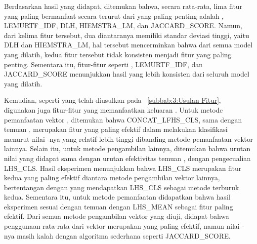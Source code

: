 Berdasarkan hasil yang didapat, ditemukan bahwa, secara rata-rata, lima fitur yang paling bermanfaat secara terurut dari yang paling penting adalah \obm{}, LEMURTF\_IDF, DLH, HIEMSTRA\_LM, dan JACCARD\_SCORE. Namun, dari kelima fitur tersebut, dua diantaranya memiliki standar deviasi tinggi, yaitu DLH dan HIEMSTRA\_LM, hal tersebut mencerminkan bahwa dari semua model \lambdamart{} yang dilatih, kedua fitur tersebut tidak konsisten menjadi fitur yang paling penting. Sementara itu, fitur-fitur seperti \obm{}, LEMURTF\_IDF, dan JACCARD\_SCORE menunjukkan hasil yang lebih konsisten dari seluruh model yang dilatih.

Kemudian, seperti yang telah diusulkan pada \subbab{}~\ref{subbab:3:Usulan Fitur}, digunakan juga fitur-fitur yang memanfaatkan keluaran \encoder{}. Untuk metode pemanfaatan vektor \encoder{} \bert{}, ditemukan bahwa CONCAT\_LFHS\_CLS, sama dengan temuan \citet{devlin2018bert}, merupakan fitur yang paling efektif dalam melakukan klasifikasi menurut nilai \importance{}-nya yang relatif lebih tinggi dibanding metode pemanfaatan vektor \bert{} lainnya. Selain itu, untuk metode pengambilan lainnya, ditemukan bahwa urutan nilai \importance{} yang didapat sama dengan urutan efektivitas temuan \citet{devlin2018bert}, dengan pengecualian LHS\_CLS. Hasil eksperimen menunjukkan bahwa LHS\_CLS merupakan fitur kedua yang paling efektif diantara metode pengambilan vektor \bert{} lainnya, bertentangan dengan \citet{devlin2018bert} yang mendapatkan LHS\_CLS sebagai metode terburuk kedua. Sementara itu, untuk metode pemanfaatan \encoder{} \tfive{} didapatkan bahwa hasil eksperimen sesuai dengan temuan \citet{ni2021sentence} dengan LHS\_MEAN sebagai fitur paling efektif. Dari semua metode pengambilan vektor yang diuji, didapat bahwa penggunaan rata-rata dari vektor \hs{} \tfive{} merupakan yang paling efektif, namun nilai \importance{}-nya masih kalah dengan algoritma sederhana seperti JACCARD\_SCORE.

